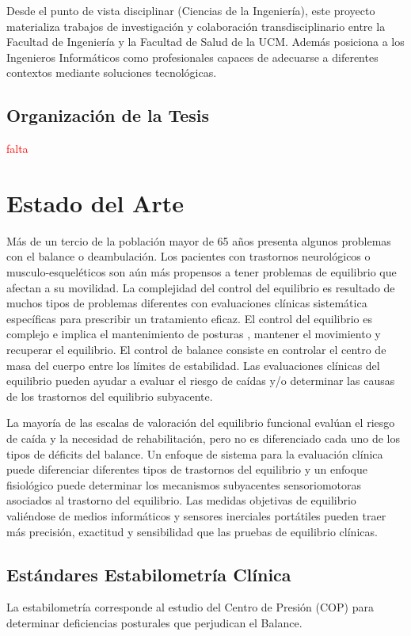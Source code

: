 \documentclass[12pt,a4paper]{article}
\begin{document}
Desde el punto de vista disciplinar (Ciencias de la Ingeniería), este proyecto materializa trabajos de investigación y colaboración transdisciplinario entre la Facultad de Ingeniería y la Facultad de Salud de la UCM. Además posiciona a los Ingenieros Informáticos como profesionales capaces de adecuarse a diferentes contextos mediante soluciones tecnológicas.

\subsection{Organizaci\'on de la Tesis}
\textcolor{red}{falta}


\section{Estado del Arte}
Más de un tercio de la población mayor de 65 años presenta algunos problemas con el balance o deambulación. Los pacientes con trastornos neurológicos o musculo-esqueléticos son aún más propensos a tener problemas de equilibrio que afectan a su movilidad. La complejidad del control del equilibrio es resultado  de muchos tipos de problemas diferentes con evaluaciones clínicas sistemática específicas para prescribir un tratamiento eficaz.
El control del equilibrio es complejo e implica el mantenimiento de posturas \cite{mancini_relevance_2010}, mantener el movimiento y recuperar el equilibrio. El control de balance consiste en controlar el centro de masa del cuerpo entre los límites de estabilidad. Las evaluaciones clínicas del equilibrio pueden ayudar a evaluar el riesgo de caídas y/o determinar las causas de los trastornos del equilibrio subyacente.

La mayoría de las escalas de valoración del equilibrio funcional evalúan el riesgo de caída y la necesidad de rehabilitación, pero no es diferenciado cada uno de los tipos de déficits del balance. Un enfoque de sistema para la evaluación clínica puede diferenciar diferentes tipos de trastornos del equilibrio y un enfoque fisiológico puede determinar los mecanismos subyacentes sensoriomotoras asociados al trastorno del equilibrio. Las medidas objetivas de equilibrio valiéndose de medios informáticos y sensores inerciales portátiles pueden traer más precisión, exactitud y sensibilidad que las pruebas de equilibrio clínicas.

\subsection{Estándares Estabilometría Clínica}
La estabilometría corresponde al estudio del Centro de Presión (COP) para determinar deficiencias posturales que perjudican el Balance.
\end{document}
